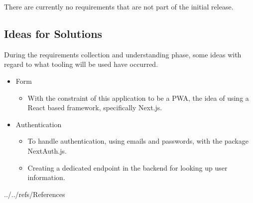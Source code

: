 \documentclass[12pt]{article}
\begin{document}
There are currently no requirements that are not part of the initial release.

\subsection{Ideas for Solutions}

During the requirements collection and understanding phase, some ideas with regard to what tooling
will be used have occurred.

\begin{itemize}
	\item Form
	      \begin{itemize}
		      \item With the constraint of this application to be a PWA, the idea of using a React based framework,
		            specifically Next.js.
	      \end{itemize}
	\item Authentication
	      \begin{itemize}
		      \item To handle authentication, using emails and passwords, with the package NextAuth.js.
		      \item Creating a dedicated endpoint in the backend for looking up user information.
	      \end{itemize}
\end{itemize}

\newpage



 {../../refs/References}

\newpage

\noindent {}
\end{document}

